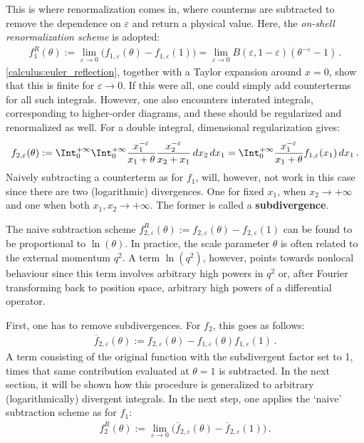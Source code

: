     This is where renormalization comes in, where counterms are subtracted to remove the dependence on $\varepsilon$ and return a physical value. Here, the \textit{on-shell renormalization scheme} is adopted:
    \begin{gather}
        f_1^R(\theta) := \lim_{\varepsilon\rightarrow0}\bigl(f_{1,\varepsilon}(\theta)-f_{1,\varepsilon}(1)\bigr) = \lim_{\varepsilon\rightarrow0}B(\varepsilon,1-\varepsilon)(\theta^{-\varepsilon}-1)\,.
    \end{gather}
    \cref{calculus:euler_reflection}, together with a Taylor expansion around $x=0$, show that this is finite for $\varepsilon\longrightarrow0$. If this were all, one could simply add counterterms for all such integrals. However, one also encounters interated integrals, corresponding to higher-order diagrams, and these should be regularized and renormalized as well. For a double integral, dimensional regularization gives:
    \begin{gather}
        f_{2,\varepsilon}(\theta) := \Int_0^{+\infty}\Int_0^{+\infty}\frac{x_1^{-\varepsilon}}{x_1+\theta}\frac{x_2^{-\varepsilon}}{x_2+x_1}\,dx_2\,dx_1 = \Int_0^{+\infty}\frac{x_1^{-\varepsilon}}{x_1+\theta}f_{1,\varepsilon}(x_1)\,dx_1\,.
    \end{gather}
    Naively subtracting a counterterm as for $f_1$, will, however, not work in this case since there are two (logarithmic) divergences. One for fixed $x_1$, when $x_2\longrightarrow+\infty$ and one when both $x_1,x_2\longrightarrow+\infty$. The former is called a \textbf{subdivergence}.

    \begin{remark}[Nonlocality]
        The naive subtraction scheme $f_{2,\varepsilon}^R(\theta) := f_{2,\varepsilon}(\theta) - f_{2,\varepsilon}(1)$ can be found to be proportional to $\ln(\theta)$. In practice, the scale parameter $\theta$ is often related to the external momentum $q^2$. A term $\ln(q^2)$, however, points towards nonlocal behaviour since this term involves arbitrary high powers in $q^2$ or, after Fourier transforming back to position space, arbitrary high powers of a differential operator.
    \end{remark}

    First, one has to remove subdivergences. For $f_2$, this goes as follows:
    \begin{gather}
        \overline{f}_{2,\varepsilon}(\theta) := f_{2,\varepsilon}(\theta) - f_{1,\varepsilon}(\theta)f_{1,\varepsilon}(1)\,.
    \end{gather}
    A term consisting of the original function with the subdivergent factor set to 1, times that same contribution evaluated at $\theta=1$ is subtracted. In the next section, it will be shown how this procedure is generalized to arbitrary (logarithmically) divergent integrals. In the next step, one applies the `naive' subtraction scheme as for $f_1$:
    \begin{gather}
        f_2^R(\theta) := \lim_{\varepsilon\rightarrow0}\bigl(\overline{f}_{2,\varepsilon}(\theta)-\overline{f}_{2,\varepsilon}(1)\bigr)\,.
    \end{gather}

